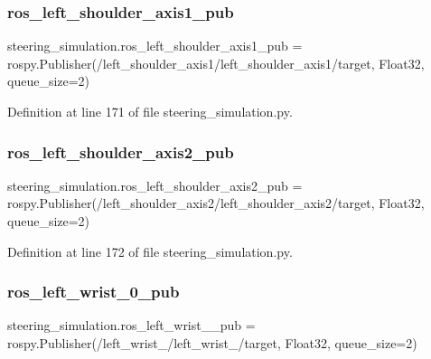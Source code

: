 \subsubsection{\texorpdfstring{ros\_left\_shoulder\_axis1\_pub}{ros\_left\_shoulder\_axis1\_pub}}
{\footnotesize\ttfamily steering\+\_\+simulation.\+ros\+\_\+left\+\_\+shoulder\+\_\+axis1\+\_\+pub = rospy.\+Publisher(\textquotesingle{}/left\+\_\+shoulder\+\_\+axis1/left\+\_\+shoulder\+\_\+axis1/target\textquotesingle{}, Float32, queue\+\_\+size=2)}



Definition at line 171 of file steering\+\_\+simulation.\+py.

\mbox{\label{namespacesteering__simulation_af594d9d0bfdf575e6e26e0b6a3a53c8b}} 
\subsubsection{\texorpdfstring{ros\_left\_shoulder\_axis2\_pub}{ros\_left\_shoulder\_axis2\_pub}}
{\footnotesize\ttfamily steering\+\_\+simulation.\+ros\+\_\+left\+\_\+shoulder\+\_\+axis2\+\_\+pub = rospy.\+Publisher(\textquotesingle{}/left\+\_\+shoulder\+\_\+axis2/left\+\_\+shoulder\+\_\+axis2/target\textquotesingle{}, Float32, queue\+\_\+size=2)}



Definition at line 172 of file steering\+\_\+simulation.\+py.

\mbox{\label{namespacesteering__simulation_aae568c25dad5bee09d010a369a03d5c4}} 
\subsubsection{\texorpdfstring{ros\_left\_wrist\_0\_pub}{ros\_left\_wrist\_0\_pub}}
{\footnotesize\ttfamily steering\+\_\+simulation.\+ros\+\_\+left\+\_\+wrist\+\_\+\_\+pub = rospy.\+Publisher(\textquotesingle{}/left\+\_\+wrist\+\_/left\+\_\+wrist\+\_/target\textquotesingle{}, Float32, queue\+\_\+size=2)}




